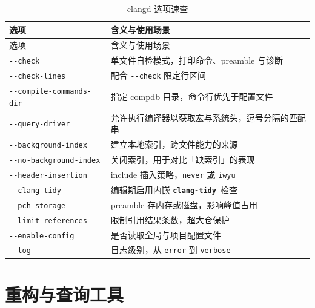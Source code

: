 \documentclass[12pt,a4paper,fontset=fandol]{ctexbook}
\newcommand{\Opt}[1]{\texttt{-\/-#1}}
\newcommand{\Lib}[1]{\textbf{\texttt{#1}}}
\newcommand{\Tidy}{\Lib{clang-tidy}}
\begin{document}
{\footnotesize
\begin{longtable}{@{}>{\raggedright\arraybackslash}p{}
                  >{\raggedright\arraybackslash}p{}@{}}
\caption{clangd 选项速查}\label{tab:appB-clangd}\\
\toprule
选项 & 含义与使用场景 \\
\midrule
\endfirsthead
\toprule
选项 & 含义与使用场景 \\
\midrule
\endhead
\bottomrule
\endlastfoot
\Opt{check} & 单文件自检模式，打印命令、preamble 与诊断 \\
\Opt{check-lines} & 配合 \Opt{check} 限定行区间 \\
\Opt{compile-commands-dir} & 指定 compdb 目录，命令行优先于配置文件 \\
\Opt{query-driver} & 允许执行编译器以获取宏与系统头，逗号分隔的匹配串 \\
\Opt{background-index} & 建立本地索引，跨文件能力的来源 \\
\Opt{no-background-index} & 关闭索引，用于对比「缺索引」的表现 \\
\Opt{header-insertion} & include 插入策略，\texttt{never} 或 \texttt{iwyu} \\
\Opt{clang-tidy} & 编辑期启用内嵌 \Tidy\ 检查 \\
\Opt{pch-storage} & preamble 存内存或磁盘，影响峰值占用 \\
\Opt{limit-references} & 限制引用结果条数，超大仓保护 \\
\Opt{enable-config} & 是否读取全局与项目配置文件 \\
\Opt{log} & 日志级别，从 \texttt{error} 到 \texttt{verbose} \\
\end{longtable}
}

\section{重构与查询工具}\label{sec:appB-s4}
\end{document}
